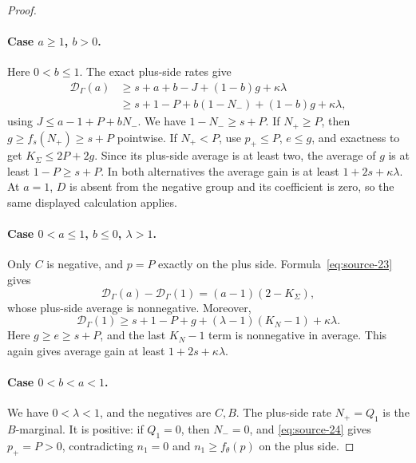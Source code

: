 \begin{proof}
\paragraph{Case \(a\ge1\), \(b>0\).}
Here \(0<b\le1\). The exact plus-side rates give
\[
\begin{split}
\mathcal D_\Gamma(a)
&\ge s+a+b-J+(1-b)g+\kappa\lambda\\
&\ge s+1-P+b(1-N_-)+(1-b)g+\kappa\lambda,
\end{split}
\]
using \(J\le a-1+P+bN_-\). We have \(1-N_-\ge s+P\).
If \(N_+\ge P\), then \(g\ge f_s(N_+)\ge s+P\) pointwise.
If \(N_+<P\), use \(p_+\le P\), \(e\le g\), and exactness to
get \(K_\Sigma\le2P+2g\). Since its plus-side average is at least
two, the average of \(g\) is at least \(1-P\ge s+P\).
In both alternatives the average gain is at least
\(1+2s+\kappa\lambda\). At \(a=1\), \(D\) is absent from the
negative group and its coefficient is zero, so the same displayed
calculation applies.

\paragraph{Case \(0<a\le1\), \(b\le0\), \(\lambda>1\).}
Only \(C\) is negative, and \(p=P\) exactly on the plus side.
Formula~\eqref{eq:source-23} gives
\[
\mathcal D_\Gamma(a)-\mathcal D_\Gamma(1)
=(a-1)(2-K_\Sigma),
\]
whose plus-side average is nonnegative. Moreover,
\[
\mathcal D_\Gamma(1)
\ge s+1-P+g+(\lambda-1)(K_N-1)+\kappa\lambda.
\]
Here \(g\ge e\ge s+P\), and the last \(K_N-1\) term is
nonnegative in average. This again gives average gain at least
\(1+2s+\kappa\lambda\).

\paragraph{Case \(0<b<a<1\).}
We have \(0<\lambda<1\), and the negatives are \(C,B\).
The plus-side rate \(N_+=Q_1\) is the \(B\)-marginal.
It is positive: if \(Q_1=0\), then \(N_-=0\), and
\eqref{eq:source-24} gives \(p_+=P>0\), contradicting
\(n_1=0\) and \(n_1\ge f_\theta(p)\) on the plus side.


\end{proof}
